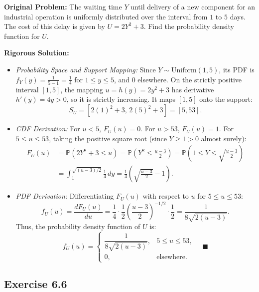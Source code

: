 \documentclass[11pt, letterpaper]{article}
\theoremstyle{definition}
\theoremstyle{remark}
\newcommand{\Prob}{\mathbb{P}}
\begin{document}
\textbf{Original Problem:}
The waiting time $Y$ until delivery of a new component for an industrial operation is uniformly distributed over the interval from $1$ to $5$ days. The cost of this delay is given by $U = 2Y^2 + 3$. Find the probability density function for $U$.

\hrulefill

\textbf{Rigorous Solution:}

\begin{itemize}
    \item \textit{Probability Space and Support Mapping:} Since $Y \sim \text{Uniform}(1, 5)$, its PDF is $f_Y(y) = \frac{1}{5 - 1} = \frac{1}{4}$ for $1 \le y \le 5$, and $0$ elsewhere. On the strictly positive interval $[1, 5]$, the mapping $u = h(y) = 2y^2 + 3$ has derivative $h'(y) = 4y > 0$, so it is strictly increasing. It maps $[1, 5]$ onto the support:
    \[
        S_U = [2(1)^2 + 3, \, 2(5)^2 + 3] = [5, 53].
    \]
    \item \textit{CDF Derivation:} For $u < 5$, $F_U(u) = 0$. For $u > 53$, $F_U(u) = 1$. For $5 \le u \le 53$, taking the positive square root (since $Y \ge 1 > 0$ almost surely):
    \begin{align*}
        F_U(u) &= \Prob(2Y^2 + 3 \le u) = \Prob\left(Y^2 \le \frac{u - 3}{2}\right) = \Prob\left(1 \le Y \le \sqrt{\frac{u - 3}{2}}\right) \\
        &= \int_{1}^{\sqrt{(u - 3)/2}} \frac{1}{4}\,dy = \frac{1}{4}\left(\sqrt{\frac{u - 3}{2}} - 1\right).
    \end{align*}
    \item \textit{PDF Derivation:} Differentiating $F_U(u)$ with respect to $u$ for $5 \le u \le 53$:
    \[
        f_U(u) = \frac{dF_U(u)}{du} = \frac{1}{4} \cdot \frac{1}{2}\left(\frac{u - 3}{2}\right)^{-1/2} \cdot \frac{1}{2} = \frac{1}{8\sqrt{2(u - 3)}}.
    \]
    Thus, the probability density function of $U$ is:
    \[
        f_U(u) = \begin{cases} \dfrac{1}{8\sqrt{2(u - 3)}}, & 5 \le u \le 53, \\[8pt] 0, & \text{elsewhere.} \end{cases} \quad \blacksquare
    \]
\end{itemize}

\subsection{Exercise 6.6}
\end{document}
